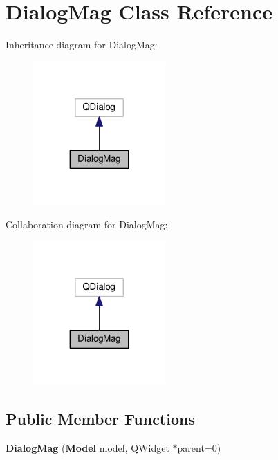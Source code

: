 \section{Dialog\+Mag Class Reference}
\label{class_dialog_mag}


Inheritance diagram for Dialog\+Mag\+:\nopagebreak
\begin{figure}[H]
\begin{center}
\leavevmode
\includegraphics[width=143pt]{class_dialog_mag__inherit__graph}
\end{center}
\end{figure}


Collaboration diagram for Dialog\+Mag\+:\nopagebreak
\begin{figure}[H]
\begin{center}
\leavevmode
\includegraphics[width=143pt]{class_dialog_mag__coll__graph}
\end{center}
\end{figure}
\subsection*{Public Member Functions}
\begin{DoxyCompactItemize}
\item 
{\bfseries Dialog\+Mag} ({\bf Model} model, Q\+Widget $\ast$parent=0)\label{class_dialog_mag_aabc1d87b82f0b3c659db8343520228a5}

\end{DoxyCompactItemize}
